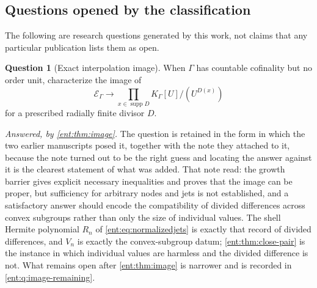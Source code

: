 \documentclass[11pt]{article}
\theoremstyle{plain}
\theoremstyle{plain}
\theoremstyle{plain}
\theoremstyle{definition}
\theoremstyle{definition}
\theoremstyle{definition}
\theoremstyle{definition}
\newtheorem{question}[question]{Question}
\theoremstyle{remark}
\newcommand{\K}{K_\Gamma}\newcommand{\KD}{K_\Delta}
\newcommand{\E}{\mathcal E_\Gamma}
\DeclareMathOperator{\supp}{supp}\DeclareMathOperator{\lc}{lc}
\begin{document}
\subsection{Questions opened by the classification}
\label{ent:subsec:questions}
The following are research questions generated by this work, not claims that
any particular publication lists them as open.

\begin{question}[Exact interpolation image]\label{ent:q:image}
When $\Gamma$ has countable cofinality but no order unit, characterize the
image of
\[
 \E\longrightarrow\prod_{x\in\supp D}\K[U]/(U^{D(x)})
\]
for a prescribed radially finite divisor $D$.
\end{question}
\emph{Answered, by \cref{ent:thm:image}.} The question is retained in the
form in which the two earlier manuscripts posed it, together with the note
they attached to it, because the note turned out to be the right guess and
locating the answer against it is the clearest statement of what was added.
That note read: the growth barrier gives explicit necessary inequalities and
proves that the image can be proper, but sufficiency for arbitrary nodes and
jets is not established, and a satisfactory answer should encode the
compatibility of divided differences across convex subgroups rather than only
the size of individual values. The shell Hermite polynomial $R_n$ of
\eqref{ent:eq:normalizedjets} is exactly that record of divided differences,
and $V_n$ is exactly the convex-subgroup datum;
\cref{ent:thm:close-pair} is the instance in which individual values are
harmless and the divided difference is not. What remains open after
\cref{ent:thm:image} is narrower and is recorded in
\cref{ent:q:image-remaining}.
\end{document}
